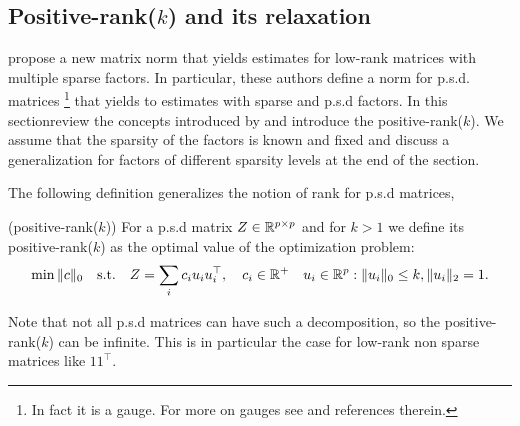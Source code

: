  


%


\subsection{Positive-rank($k$) and its relaxation}
\label{subsec:norm}

\citet{richard2014tight} propose a new matrix norm that yields estimates for low-rank matrices with multiple sparse factors. In particular, these authors define a norm for p.s.d. matrices \footnote{In fact it is a gauge. For more on gauges see \citet{chandrasekaran2010convex} and references therein.}  that yields to estimates with sparse and p.s.d factors. In this sectionreview the concepts introduced by \citet{richard2014tight} and introduce the positive-rank($k$). We assume that the sparsity of the factors is known and fixed and discuss a generalization for factors of different sparsity levels at the end of the section.

The following definition generalizes the notion of rank for p.s.d matrices,
\begin{mydef}
(positive-rank($k$)) For a p.s.d  matrix $Z\in\mathbb{R}^{p\times p}$ and for $k>1$ we define its positive-rank($k$) as the optimal
value of the optimization problem:
\begin{align}
\min \|c\|_0 \quad \text{s.t.} \quad Z=\sum_{i} c_i u_i u_{i}^\top, \quad c_i\in \mathbb{R}^{+} \quad u_{i}\in\mathbb{R}^p  :   \|u_{i}\|_0 \leq k, \|u_{i}\|_2 = 1.
\end{align}
\end{mydef}
Note that not all p.s.d matrices can have such a decomposition, so the positive-rank($k$) can be infinite. This is in particular the case for low-rank non sparse matrices like $11^{\top}$. 

